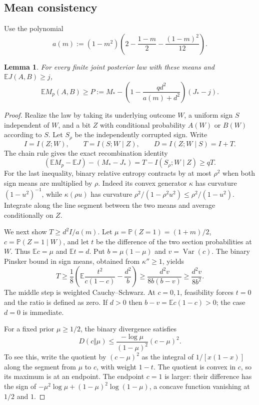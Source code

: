 \documentclass[11pt]{article}
\newtheorem{lemma}[theorem]{Lemma}
\newcommand{\E}{\mathbb E}\newcommand{\Prb}{\mathbb P}
\numberwithin{equation}{section}
\begin{document}
\subsection{Mean consistency}
Use the polynomial
\begin{equation}\label{allowance}
 a(m):=(1-m^2)\left(2-\frac{1-m}{2}-\frac{(1-m)^2}{12}\right).
\end{equation}
\begin{lemma}\label{consistency}
For every finite joint posterior law with these means and $\E J(A,B)\ge j$,
\begin{equation}\label{Pbound}
 \E M_p(A,B)\ge
 P:=M_*-\left(1-\frac{qd^2}{a(m)+d^2}\right)(J_*-j).
\end{equation}
\end{lemma}
\begin{proof}
Realize the law by taking its underlying outcome $W$, a uniform sign $S$ independent of $W$, and a bit $Z$ with conditional probability $A(W)$ or $B(W)$ according to $S$. Let $S_\rho$ be the independently corrupted sign. Write
\[
 I=I(Z;W),\qquad T=I(S;W\mid Z),\qquad D=I(Z;W\mid S)=I+T.
\]
The chain rule gives the exact recombination identity
\begin{equation}\label{recombine}
 (\E M_p-\E J)-(M_*-J_*)=T-I(S_\rho;W\mid Z)\ge qT.
\end{equation}
For the last inequality, binary relative entropy contracts by at most $\rho^2$ when both sign means are multiplied by $\rho$. Indeed its convex generator $\kappa$ has curvature $(1-u^2)^{-1}$, while $\kappa(\rho u)$ has curvature $\rho^2/(1-\rho^2u^2)\le\rho^2/(1-u^2)$. Integrate along the line segment between the two means and average conditionally on $Z$.

We next show $T\ge d^2I/a(m)$. Let $\mu=\Prb(Z=1)=(1+m)/2$, $c=\Prb(Z=1\mid W)$, and let $t$ be the difference of the two section probabilities at $W$. Thus $\E c=\mu$ and $\E t=d$. Put $b=\mu(1-\mu)$ and $v=\operatorname{Var}(c)$. The binary Pinsker bound in sign means, obtained from $\kappa''\ge1$, yields
\[
 T\ge\frac18\left(\E\frac{t^2}{c(1-c)}-\frac{d^2}{b}\right)
 \ge\frac{d^2v}{8b(b-v)}\ge\frac{d^2v}{8b^2}.
\]
The middle step is weighted Cauchy--Schwarz. At $c=0,1$, feasibility forces $t=0$ and the ratio is defined as zero. If $d>0$ then $b-v=\E c(1-c)>0$; the case $d=0$ is immediate.

For a fixed prior $\mu\ge1/2$, the binary divergence satisfies
\[
 D(c\Vert\mu)\le\frac{-\log\mu}{(1-\mu)^2}(c-\mu)^2.
\]
To see this, write the quotient by $(c-\mu)^2$ as the integral of $1/[x(1-x)]$ along the segment from $\mu$ to $c$, with weight $1-t$. The quotient is convex in $c$, so its maximum is at an endpoint. The endpoint $c=1$ is larger: their difference has the sign of $-\mu^2\log\mu+(1-\mu)^2\log(1-\mu)$, a concave function vanishing at $1/2$ and $1$.


\end{proof}
\end{document}
